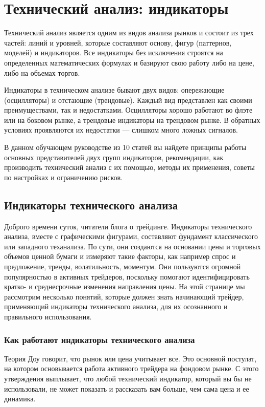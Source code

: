 \documentclass[a5paper]{article}
\begin{document}
\section{Технический анализ: индикаторы}

Технический анализ является одним из видов анализа рынков и состоит из трех частей: линий и уровней, которые составляют основу, фигур (паттернов, моделей) и индикаторов. Все индикаторы без исключения строятся на определенных математических формулах и базируют свою работу либо на цене, либо на объемах торгов.

Индикаторы в техническом анализе бывают двух видов: опережающие (осцилляторы) и отстающие (трендовые). Каждый вид представлен как своими преимуществами, так и недостатками. Осцилляторы хорошо работают во флэте или на боковом рынке, а трендовые индикаторы на трендовом рынке. В обратных условиях проявляются их недостатки — слишком много ложных сигналов.

В данном обучающем руководстве из 10 статей вы найдете принципы работы
основных представителей двух групп индикаторов, рекомендации, как
производить технический анализ с их помощью, методы их применения,
советы по настройках и ограничению рисков.

\subsection{Индикаторы технического анализа}

Доброго времени суток, читатели блога о трейдинге. Индикаторы
технического анализа, вместе с графическими фигурами, составляют
фундамент классического или западного теханализа. По сути, они
создаются на основании цены и торговых объемов ценной бумаги и
измеряют такие факторы, как например спрос и предложение, тренды,
волатильность, моментум. Они пользуются огромной популярностью в
активных трейдеров, поскольку помогают идентифицировать кратко- и
среднесрочные изменения направления цены. На этой странице мы
рассмотрим несколько понятий, которые должен знать начинающий трейдер,
применяющий индикаторы технического анализа, для их осознанного и
правильного использования.

\subsubsection{Как работают индикаторы технического анализа}

Теория Доу говорит, что рынок или цена учитывает все. Это основной постулат, на котором основывается работа активного трейдера на фондовом рынке. С этого утверждения выплывает, что любой технический индикатор, который вы бы не использовали, не может показать и рассказать вам больше, чем сама цена и ее динамика.
\end{document}
